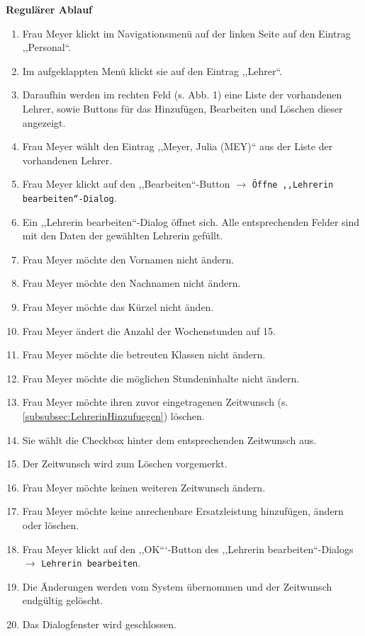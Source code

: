 \documentclass[fontsize=12pt,paper=a4,twoside]{scrartcl}
\begin{document}
\textbf{Regulärer Ablauf}
\begin{enumerate}
\item Frau Meyer klickt im Navigationsmenü auf der linken Seite auf den Eintrag ,,Personal``.
\item Im aufgeklappten Menü klickt sie auf den Eintrag ,,Lehrer``.
\item Daraufhin werden im rechten Feld (s. Abb. 1) eine Liste der vorhandenen Lehrer, sowie Buttons für das Hinzufügen, Bearbeiten und Löschen dieser angezeigt.
\item Frau Meyer wählt den Eintrag ,,Meyer, Julia (MEY)`` aus der Liste der vorhandenen Lehrer.
\item Frau Meyer klickt auf den ,,Bearbeiten``-Button $\rightarrow$ \texttt{Öffne ,,Lehrerin bearbeiten``-Dialog}.
\item Ein ,,Lehrerin bearbeiten``-Dialog öffnet sich. Alle entsprechenden Felder sind mit den Daten der gewählten Lehrerin gefüllt.
\item Frau Meyer möchte den Vornamen nicht ändern.
\item Frau Meyer möchte den Nachnamen nicht ändern.
\item Frau Meyer möchte das Kürzel nicht änden.
\item Frau Meyer ändert die Anzahl der Wochenstunden auf 15.
\item Frau Meyer möchte die betreuten Klassen nicht ändern.
\item Frau Meyer möchte die möglichen Stundeninhalte nicht ändern.
\item Frau Meyer möchte ihren zuvor eingetragenen Zeitwunsch (s.
		\ref{subsubsec:LehrerinHinzufuegen}) löschen.
\item Sie wählt die Checkbox hinter dem entsprechenden Zeitwunsch aus.
\item Der Zeitwunsch wird zum Löschen vorgemerkt.
\item Frau Meyer möchte keinen weiteren Zeitwunsch ändern.
\item Frau Meyer möchte keine anrechenbare Ersatzleistung hinzufügen, ändern oder löschen.
\item Frau Meyer klickt auf den ,,OK```-Button des ,,Lehrerin bearbeiten``-Dialogs $\rightarrow$ \texttt{Lehrerin bearbeiten}.
\item Die Änderungen werden vom System übernommen und der Zeitwunsch endgültig gelöscht.
\item Das Dialogfenster wird geschlossen.
\end{enumerate}
\vspace{5pt}
\end{document}
